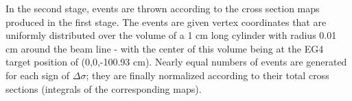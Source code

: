 
In the second stage, events are thrown %
according to the cross section maps produced in the first stage. %
The events are given vertex coordinates that are uniformly distributed over the volume of a 1 cm long cylinder with radius 0.01 cm around the beam line - with the center of this volume being at the EG4 target position of (0,0,-100.93 cm). Nearly equal numbers of events are generated for each %
 sign of $\Delta \sigma$; they are finally normalized according to their total cross sections (integrals %
of the corresponding maps). %



